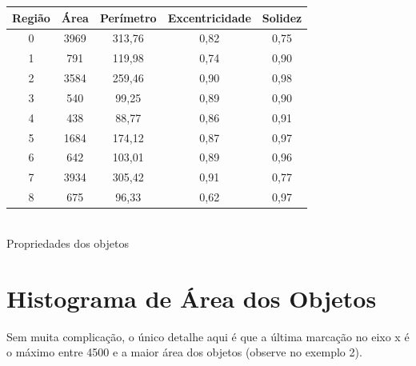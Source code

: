 \documentclass[12pt, letterpaper]{article}
\begin{document}
    \begin{center}
    \begin{tabular}{||c c c c c||}
        \hline
        Região & Área & Perímetro & Excentricidade & Solidez \\ [0.5ex] 
        \hline\hline
        0 & 3969 &  313,76 & 0,82 & 0,75 \\ 
        \hline
        1 & 791 & 119,98 & 0,74 & 0,90 \\
        \hline
        2 & 3584 & 259,46 & 0,90 & 0,98 \\
        \hline
        3 & 540 & 99,25 & 0,89 & 0,90 \\
        \hline
        4 & 438 & 88,77 & 0,86 & 0,91 \\ 
        \hline
        5 & 1684 & 174,12 & 0,87 & 0,97 \\ 
        \hline
        6 & 642 & 103,01 & 0,89 & 0,96 \\ 
        \hline
        7 & 3934 & 305,42 & 0,91 & 0,77 \\ 
        \hline
        8 & 675 & 96,33 & 0,62 & 0,97 \\
        \hline
    \end{tabular}
    \\ [1ex] {Propriedades dos objetos}
    \end{center}

\section{Histograma de Área dos Objetos}
    Sem muita complicação, o único detalhe aqui é que a última marcação no eixo x é o máximo entre 4500 e a maior área dos objetos (observe no exemplo 2).
\end{document}
